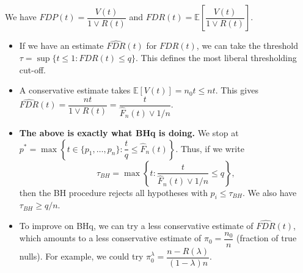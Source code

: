 \documentclass[twoside]{article}
\newcommand\bbE{\mathbb{E}}
\newcommand\lmb{\lambda}
\begin{document}
We have $FDP(t) = \dfrac{V(t)}{1 \vee R(t)}$ and $FDR(t) = \bbE \left[ \dfrac{V(t)}{1 \vee R(t)} \right]$.

\begin{itemize}
\item If we have an estimate $\widehat{FDR}(t)$ for $FDR(t)$, we can take the threshold $\tau = \sup\{t\leq 1: \widehat{FDR}(t) \leq q \}$. This defines the most liberal thresholding cut-off.

\item A conservative estimate takes $\bbE [V(t)] = n_0t \leq nt$. This gives $\widehat{FDR}(t) = \dfrac{nt}{1 \vee R(t)} = \dfrac{t}{\hat{F}_n(t) \vee 1/n}$.

\item \textbf{The above is exactly what BHq is doing.} We stop at $p^* = \max \left\{ t \in \{ p_1, \dots, p_n\}: \dfrac{t}{q} \leq \hat{F}_n(t) \right\}$. Thus, if we write
\[ \tau_{BH} = \max \left\{ t: \frac{t}{\hat{F}_n(t) \vee 1/n} \leq q \right\}, \]
then the BH procedure rejects all hypotheses with $p_i \leq \tau_{BH}$. We also have $\tau_{BH} \geq q/n$.

\item To improve on BHq, we can try a less conservative estimate of $\widehat{FDR}(t)$, which amounts to a less conservative estimate of $\pi_0 = \dfrac{n_0}{n}$ (fraction of true nulls). For example, we could try $\pi_0^\lmb = \dfrac{n - R(\lmb)}{(1-\lmb)n}$.

\end{itemize}
\end{document}
